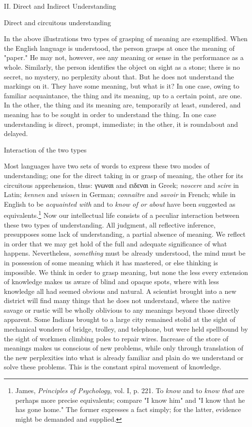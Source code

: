 \documentclass[letterpaper]{book}
\begin{document}
II. {Direct and Indirect Understanding}

Direct and circuitous understanding

In the above illustrations two types of grasping of meaning are
exemplified. When the English language is understood, the person grasps
at once the meaning of "paper." He may not, however, see any meaning or
sense in the performance as a whole. Similarly, the person identifies
the object on sight as a stone; there is no secret, no mystery, no
perplexity about that. But he does not understand the markings on it.
They
have
some meaning, but what is it? In one case, owing to familiar
acquaintance, the thing and its meaning, up to a certain point, are one.
In the other, the thing and its meaning are, temporarily at least,
sundered, and meaning has to be sought in order to understand the thing.
In one case understanding is direct, prompt, immediate; in the other, it
is roundabout and delayed.

Interaction of the two types

Most languages have two sets of words to express these two modes of
understanding; one for the direct taking in or grasp of meaning, the
other for its circuitous apprehension, thus: \textgreek{γνωναι} and
\textgreek{ειδεναι} in Greek; \emph{noscere} and \emph{scire} in Latin;
\emph{kennen} and \emph{wissen} in German; \emph{connaître} and
\emph{savoir} in French; while in English to be \emph{acquainted with}
and to \emph{know of or about} have been suggested as
equivalents.\footnote{
James, \emph{Principles of Psychology}, vol. I, p. 221. To \emph{know}
and to \emph{know that} are perhaps more precise equivalents; compare "I
know him" and "I know that he has gone home." The former expresses a
fact simply; for the latter, evidence might be demanded and supplied.
}
Now our intellectual life consists of a peculiar interaction between
these two types of understanding. All judgment, all reflective
inference, presupposes some lack of understanding, a partial absence of
meaning. We reflect in order that we may get hold of the full and
adequate significance of what happens. Nevertheless, \emph{something}
must be already understood, the mind must be in possession of some
meaning which it has mastered, or else thinking is impossible. We think
in order to grasp meaning, but none the less every extension of
knowledge makes us aware of blind and opaque spots, where with less
knowledge all had seemed obvious and natural. A scientist brought into a
new district will find many things that he does not understand, where
the native savage
or
rustic will be wholly oblivious to any meanings beyond those directly
apparent. Some Indians brought to a large city remained stolid at the
sight of mechanical wonders of bridge, trolley, and telephone, but were
held spellbound by the sight of workmen climbing poles to repair wires.
Increase of the store of meanings makes us conscious of new problems,
while only through translation of the new perplexities into what is
already familiar and plain do we understand or solve these problems.
This is the constant spiral movement of knowledge.
\end{document}
